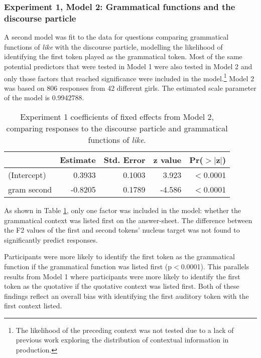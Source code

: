 \subsubsection{Experiment 1, Model 2: Grammatical functions and the discourse particle}

A second model was fit to the data for questions comparing grammatical functions of \textit{like} with the discourse particle, modelling the likelihood of identifying the first token played as the grammatical token.  Most of the same potential predictors that were tested in Model 1 were also tested in Model 2 and only those factors that reached significance were included in the model.\footnote{The likelihood of the preceding context was not tested due to a lack of previous work exploring the distribution of contextual information in production.}  Model 2 was based on 806 responses from 42 different girls.  The estimated scale parameter of the model is 0.9942788.



\begin{table}[ht]
\begin{center}
\begin{tabular}{lrrrr}
  \hline
 & Estimate & Std. Error & z value& Pr($>$$|$z$|$) \\
  \hline
(Intercept) & 0.3933  &   0.1003  & 3.923 & $<$0.0001 \\
  gram second & -0.8205  &   0.1789  & -4.586 & $<$0.0001 \\
   \hline
\end{tabular}
\caption{Experiment 1 coefficients of fixed effects from Model 2, comparing responses to the discourse particle and grammatical functions of \textit{like}.}
\label{gdcoeff1}
\end{center}
\end{table}

As shown in Table \ref{gdcoeff1}, only one factor was included in the model: whether the grammatical context was listed first on the answer-sheet.  The difference between the F2 values of the first and second tokens' nucleus target was not found to significantly predict responses.

Participants were more likely to identify the first token as the grammatical function if the grammatical function was listed first (p$<$0.0001).  This parallels results from Model 1 where participants were more likely to identify the first token as the quotative if the quotative context was listed first.  Both of these findings reflect an overall bias with identifying the first auditory token with the first context listed.  


